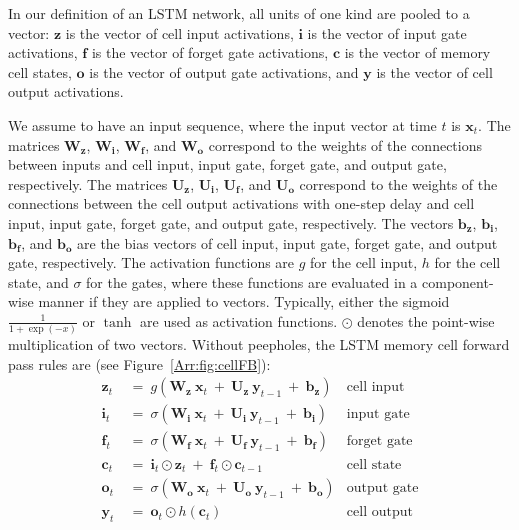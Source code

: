 \documentclass[runningheads]{llncs}
\newcommand\Bb{\bm{b}}%
\newcommand\Bc{\bm{c}}%
\newcommand\Bi{\bm{i}}%
\newcommand\Bo{\bm{o}}%
\newcommand\Bf{\bm{f}}%
\newcommand\Bx{\bm{x}}%
\newcommand\By{\bm{y}}%
\newcommand\Bz{\bm{z}}%
\newcommand\BU{\bm{U}}%
\newcommand\BW{\bm{W}}%
\begin{document}
In our definition of an LSTM network, all units of one kind are
pooled to a vector: $\Bz$ is the vector of cell input
activations, $\Bi$ is the vector of input gate
activations,  $\Bf$ is the vector of forget gate
activations,  $\Bc$ is the vector of memory cell states,
$\Bo$ is the vector of output gate
activations, and $\By$ is the vector of cell output 
activations.

We assume to have an input sequence, where the input vector at 
time $t$ is $\Bx_t$. The matrices $\BW_{\Bz}$, $\BW_{\Bi}$,
$\BW_{\Bf}$, and $\BW_{\Bo}$ correspond to the
weights of the connections between inputs and cell input, input gate, forget gate, and
output gate, respectively. The matrices $\BU_{\Bz}$, $\BU_{\Bi}$,
$\BU_{\Bf}$, and $\BU_{\Bo}$ correspond to the
weights of the connections between the cell output activations with one-step delay and cell input, input gate, forget gate, and
output gate, respectively. 
The vectors  $\Bb_{\Bz}$, $\Bb_{\Bi}$,
$\Bb_{\Bf}$, and $\Bb_{\Bo}$ are the bias vectors of cell input, input gate, forget gate, and
output gate, respectively.
The activation functions are $g$ for the cell input, $h$ for the cell
state, and $\sigma$ for the gates, where these functions are evaluated in a
component-wise manner if they are applied to vectors.
Typically, either the sigmoid $\frac{1}{1+\exp(-x)}$ or
$\tanh$ are used as activation functions.
$\odot$ denotes the point-wise multiplication
of two vectors. Without peepholes, the LSTM memory cell forward pass rules
are (see Figure~\ref{Arr:fig:cellFB}):
\begin{align}
\Bz_t \ &= \ g \left( \BW_{\Bz} \ \Bx_t \    + \ \BU_{\Bz} \ \By_{t-1} \  + \
   \Bb_{\Bz}\right) & \text{cell input} \label{Arr:eq_start:standard_LSTM_forward} \\
\Bi_t \ &= \ \sigma \left( \BW_{\Bi} \ \Bx_t \   + \ \BU_{\Bi} \ \By_{t-1} \  + \
    \Bb_{\Bi} \right) & \text{input gate} \\
\Bf_t \ &= \ \sigma \left( \BW_{\Bf} \ \Bx_t \  + \ \BU_{\Bf} \ \By_{t-1} \  + \
   \Bb_{\Bf} \right) & \text{forget gate} \\
\Bc_t \ &= \  \Bi_t \odot \Bz_t \ + \ 
\Bf_t \odot \Bc_{t-1} & \text{cell state} \\
\Bo_t \ &= \ \sigma \left( \BW_{\Bo} \ \Bx_t \   + \ \BU_{\Bo} \ \By_{t-1} \  + \
  \Bb_{\Bo} \right) & \text{output gate} \\
\By_t \ &= \ \Bo_t \odot h\left( \Bc_t \right) &
\text{cell output} \label{Arr:eq_end:standard_LSTM_forward}
\end{align}
\end{document}
